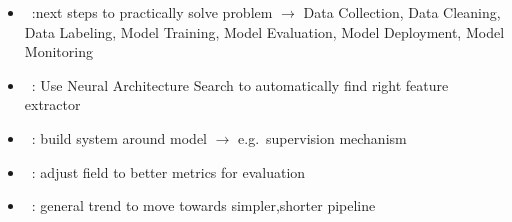 \begin{itemize}
    \item~\cite{watanabe_preliminary_2019}:next steps to practically solve problem
        $\rightarrow$  Data Collection, Data Cleaning, Data Labeling, Model Training,
        Model Evaluation, Model Deployment, Model Monitoring
    \item~\cite{zhao_improving_2020}: Use Neural Architecture Search to automatically find right
        feature extractor
    \item~\cite{siebert_construction_2021,nakamichi_requirements-driven_2020}: build system around
        model $\rightarrow$ e.g.\ supervision mechanism
    \item~\cite{shi_icdar2017_2017,he_icpr2018_2018}: adjust field to better metrics for evaluation
    \item~\cite{long_scene_2021}: general trend to move towards simpler,shorter pipeline
\end{itemize}
